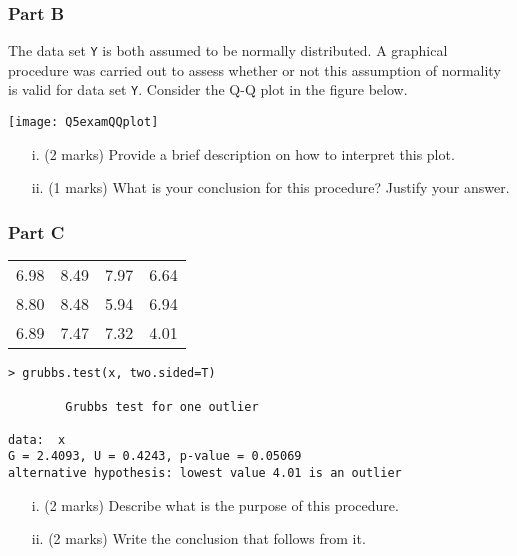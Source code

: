 \documentclass[a4paper,12pt]{article}
\begin{document}
\subsubsection*{Part B} %
The data set \texttt{Y} is both assumed to be normally distributed. A graphical procedure was carried out to assess whether or not this assumption of normality is valid for data set \texttt{Y}. Consider the Q-Q plot in the figure below.

\begin{center}
\texttt{[image: Q5examQQplot]}
\end{center}

\begin{itemize}
\item[i.] (2 marks) Provide a brief description on how to interpret this plot.
\item[ii.] (1 marks) What is your conclusion for this procedure? Justify your answer.
\end{itemize}



\subsubsection*{Part C} %
 \begin{tabular}{|cccc|}
   \hline
6.98 &8.49 &7.97& 6.64\\
8.80 &8.48 &5.94& 6.94\\
6.89 &7.47 &7.32& 4.01\\
   \hline
 \end{tabular}

\begin{center}
\begin{verbatim}
> grubbs.test(x, two.sided=T)

        Grubbs test for one outlier

data:  x
G = 2.4093, U = 0.4243, p-value = 0.05069
alternative hypothesis: lowest value 4.01 is an outlier
\end{verbatim}
\end{center}
\begin{itemize}
\item[i.] (2 marks) Describe what is the purpose of this procedure.
\item[ii.] (2 marks) Write the conclusion that follows from it.
\end{itemize}
\end{document}
